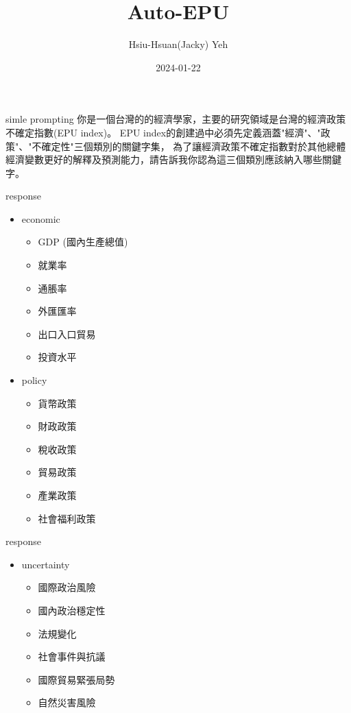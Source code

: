 \documentclass[12pt]{beamer}
\title{\huge{Auto-EPU}}
\author{Hsiu-Hsuan(Jacky) Yeh}
\date{2024-01-22}
\begin{document}
\maketitle
\begin{frame}{simle prompting}
你是一個台灣的的經濟學家，主要的研究領域是台灣的經濟政策不確定指數(EPU index)。
EPU index的創建過中必須先定義涵蓋"經濟"、"政策"、"不確定性"三個類別的關鍵字集，
為了讓經濟政策不確定指數對於其他總體經濟變數更好的解釋及預測能力，請告訴我你認為這三個類別應該納入哪些關鍵字。
\end{frame}

\begin{frame}{response}
\begin{itemize}
    \item economic
        \begin{itemize}
            \item GDP (國內生產總值)
            \item 就業率
            \item 通脹率
            \item 外匯匯率
            \item 出口入口貿易
            \item 投資水平
        \end{itemize}
    \item policy
        \begin{itemize}
            \item 貨幣政策
            \item 財政政策
            \item 稅收政策
            \item 貿易政策
            \item 產業政策
            \item 社會福利政策
        \end{itemize}
\end{itemize}
\end{frame}


\begin{frame}{response}
\begin{itemize}
    \item uncertainty
        \begin{itemize}
            \item 國際政治風險
            \item 國內政治穩定性
            \item 法規變化
            \item 社會事件與抗議
            \item 國際貿易緊張局勢
            \item 自然災害風險
        \end{itemize}
\end{itemize}
\end{frame}
\end{document}
